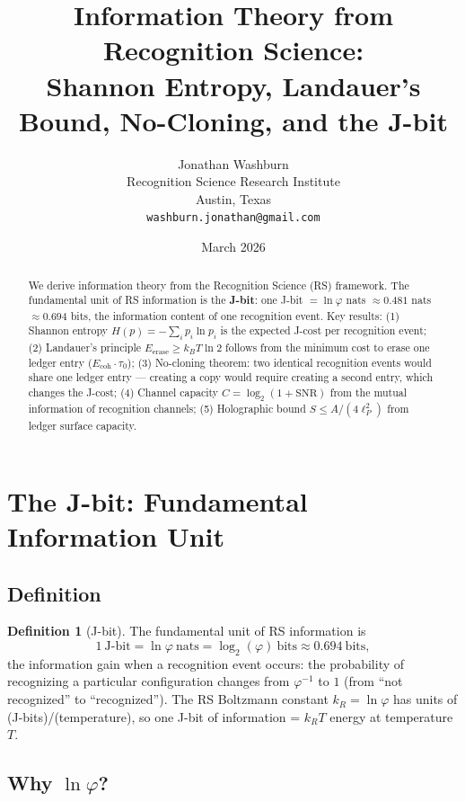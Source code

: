 \documentclass[12pt,a4paper]{article}
\title{Information Theory from Recognition Science:\\
Shannon Entropy, Landauer's Bound, No-Cloning, and the J-bit}
\author{Jonathan Washburn\\
Recognition Science Research Institute\\
Austin, Texas\\
\texttt{washburn.jonathan@gmail.com}}
\date{March 2026}
\theoremstyle{definition}
\newtheorem{definition}[theorem]{Definition}
\theoremstyle{remark}
\begin{document}
\maketitle

\begin{abstract}
We derive information theory from the Recognition Science (RS) framework.
The fundamental unit of RS information is the \textbf{J-bit}: one J-bit 
$= \ln\varphi$ nats $\approx 0.481$ nats $\approx 0.694$ bits, the information 
content of one recognition event. Key results:
(1) Shannon entropy $H(p) = -\sum_i p_i \ln p_i$ is the expected J-cost per recognition event;
(2) Landauer's principle $E_\mathrm{erase} \geq k_B T \ln 2$ follows from 
the minimum cost to erase one ledger entry ($E_\mathrm{coh} \cdot \tau_0$);
(3) No-cloning theorem: two identical recognition events would share one ledger entry — 
creating a copy would require creating a second entry, which changes the J-cost;
(4) Channel capacity $C = \log_2(1 + \mathrm{SNR})$ from the mutual information of 
recognition channels;
(5) Holographic bound $S \leq A/(4\ell_P^2)$ from ledger surface capacity.
\end{abstract}

\section{The J-bit: Fundamental Information Unit}

\subsection{Definition}

\begin{definition}[J-bit]
The fundamental unit of RS information is
\begin{equation}
1~\text{J-bit} = \ln\varphi~\text{nats} = \log_2(\varphi)~\text{bits} \approx 0.694~\text{bits},
\end{equation}
the information gain when a recognition event occurs: the probability of 
recognizing a particular configuration changes from $\varphi^{-1}$ to $1$ (from 
``not recognized'' to ``recognized'').
The RS Boltzmann constant $k_R = \ln\varphi$ has units of (J-bits)/(temperature), 
so one J-bit of information = $k_R T$ energy at temperature $T$.
\end{definition}

\subsection{Why $\ln\varphi$?}
\end{document}
